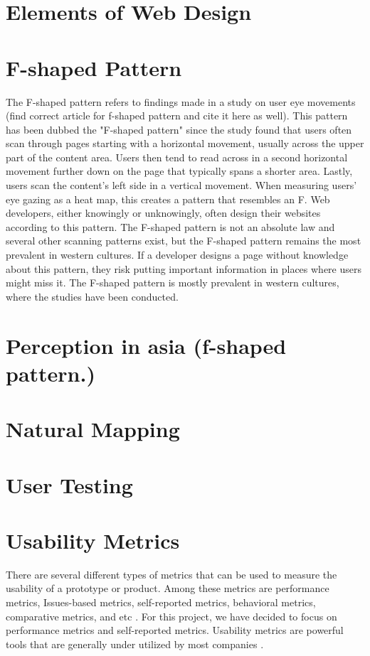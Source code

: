 \section{Elements of Web Design}
\section{F-shaped Pattern}
The F-shaped pattern refers to findings made in a study on user eye movements  \cite{pernice2014people} (find correct article for f-shaped pattern and cite it here as well). This pattern has been dubbed the "F-shaped pattern" since the study found that users often scan through pages starting with a horizontal movement, usually across the upper part of the content area. Users then tend to read across in a second horizontal movement further down on the page that typically spans a shorter area. Lastly, users scan the content’s left side in a vertical movement. When measuring users' eye gazing as a heat map, this creates a pattern that resembles an F. Web developers, either knowingly or unknowingly, often design their websites according to this pattern. The F-shaped pattern is not an absolute law and several other scanning patterns exist, but the F-shaped pattern remains the most prevalent in western cultures. \cite{f-shape_today} If a developer designs a page without knowledge about this pattern, they risk putting important information in places where users might miss it. The F-shaped pattern is mostly prevalent in western cultures, where the studies have been conducted.

\section{Perception in asia (f-shaped pattern.)}

\section{Natural Mapping}
\section{User Testing}

\section{Usability Metrics}
There are several different types of metrics that can be used to measure the usability of a prototype or product. Among these metrics are performance metrics, Issues-based metrics, self-reported metrics, behavioral metrics, comparative metrics, and etc \cite{tullis_albert_2011}. For this project, we have decided to focus on performance metrics and self-reported metrics. Usability metrics are powerful tools that are generally under utilized by most companies \cite{norman_metrics}. 

